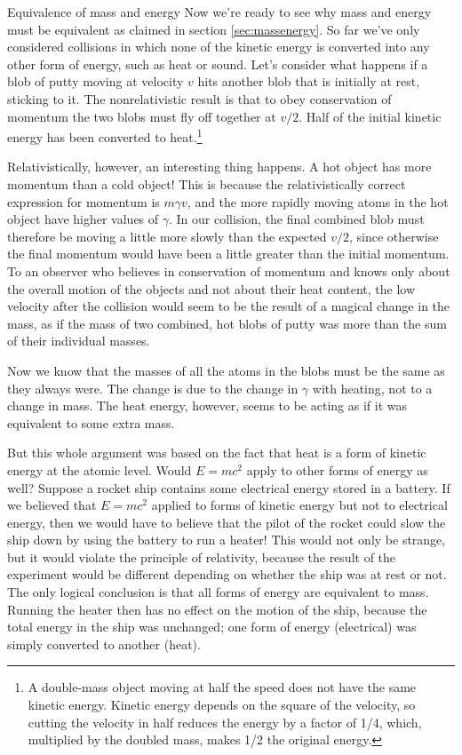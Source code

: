 \begin{envsubsection}{Equivalence of mass and energy}
Now we're ready to see why mass and energy must be equivalent as claimed
in section \ref{sec:massenergy}. So far we've only considered collisions
in which none of the kinetic energy is converted into any other form
of energy, such as heat or sound.
Let's consider what happens if a blob of putty moving at
velocity $v$ hits another blob that is initially at rest,
sticking to it.  The nonrelativistic result is
that to obey conservation of momentum the two blobs must fly
off together at $v/2$. Half of the initial kinetic energy
has been converted to heat.\footnote{A double-mass object moving
at half the speed does not have the same kinetic energy. Kinetic
energy depends on the square of the velocity, so cutting the velocity
in half reduces the energy by a factor of 1/4, which, multiplied
by the doubled mass, makes 1/2 the original energy.}

Relativistically, however, an interesting thing happens. A
hot object has more momentum than a cold object! This is
because the relativistically correct expression for momentum
is $m\gamma v$, and the more rapidly moving atoms in the hot
object have higher values of $\gamma$.
In our collision, the final combined blob must therefore be
moving a little more slowly than the expected $v/2$, since
otherwise the final momentum would have been a little
greater than the initial momentum. To an observer who
believes in conservation of momentum and knows only about
the overall motion of the objects and not about their heat
content, the low velocity after the collision would seem
to be the result of a magical change in the mass, as if the mass
of two combined, hot blobs of putty was more than the sum of
their individual masses.

Now we know that the masses of all the atoms in the blobs
must be the same as they always were. The change is due to
the change in $\gamma$ with heating, not to a change in mass.
The heat energy, however, seems to be acting as if it was
equivalent to some extra mass.

But this whole argument was based on the fact that heat is a
form of kinetic energy at the atomic level. Would $E=mc^2$
apply to other forms of energy as well? Suppose a rocket
ship contains some electrical energy stored in a
battery. If we believed that $E=mc^2$ applied to forms of
kinetic energy but not to electrical energy, then
we would have to believe that the pilot of the rocket could
slow the ship down by using the battery to run a heater!
This would not only be strange, but it would violate the
principle of relativity, because the result of the
experiment would be different depending on whether the ship
was at rest or not. The only logical conclusion is that all
forms of energy are equivalent to mass. Running the heater
then has no effect on the motion of the ship, because the
total energy in the ship was unchanged; one form of energy (electrical)
was simply converted to another (heat).
\end{envsubsection}

